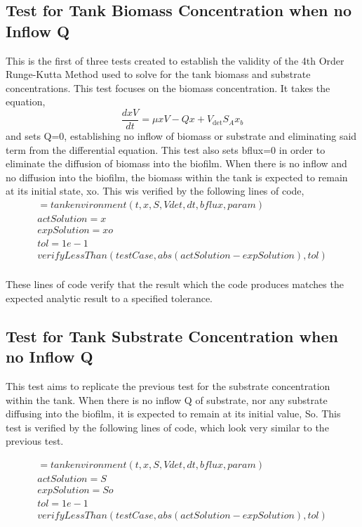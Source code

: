\documentclass[letterpaper, twoside]{article}
\numberwithin{equation}{section}
\begin{document}
\subsection{Test for Tank Biomass Concentration when no Inflow Q}
This is the first of three tests created to establish the validity of the 4th Order Runge-Kutta Method used to solve for the tank biomass and substrate concentrations. This test focuses on the biomass concentration. It takes the equation,
\begin{equation}
  \frac{dx V}{dt} = \mu xV - Q x +V_{\mathrm{det}} S_A x_b
\end{equation}
and sets Q=0, establishing no inflow of biomass or substrate and eliminating said term from the differential equation. 
This test also sets bflux=0 in order to eliminate the diffusion of biomass into the biofilm. 
When there is no inflow and no diffusion into the biofilm, the biomass within the tank is expected to remain at its initial state, xo. This wis verified by the following lines of code,
\begin{align*}
[~,~,x,~,~]=tankenvironment(t,x,S,Vdet,dt,bflux,param) \\
actSolution=x \\
expSolution=xo \\
tol=1e-1 \\
verifyLessThan(testCase,abs(actSolution-expSolution),tol) \\
\end{align*}

These lines of code verify that the result which the code produces matches the expected analytic result to a specified tolerance.

\subsection{Test for Tank Substrate Concentration when no Inflow Q}
This test aims to replicate the previous test for the substrate concentration within the tank. When there is no inflow Q of substrate, nor any substrate diffusing into the biofilm, it is expected to remain at its initial value, So. This test is verified by the following lines of code, which look very similar to the previous test.

\begin{align*}
[~,~,~,S,~]=tankenvironment(t,x,S,Vdet,dt,bflux,param) \\
actSolution=S \\
expSolution=So \\
tol=1e-1 \\
verifyLessThan(testCase,abs(actSolution-expSolution),tol) \\
\end{align*}
\end{document}
